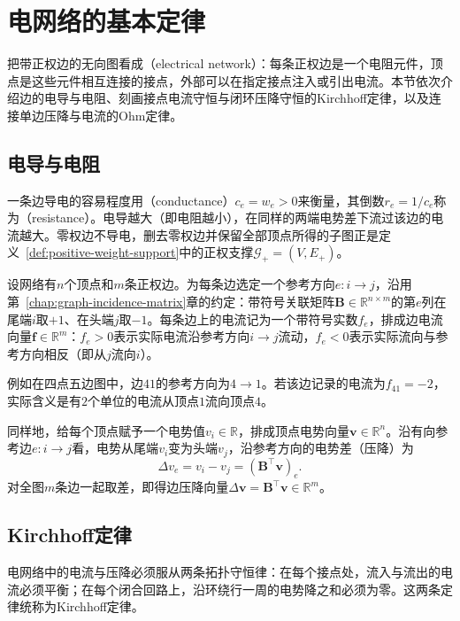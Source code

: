 \section{电网络的基本定律}
\label{sec:electrical-network-laws}

把带正权边的无向图看成（electrical network）：每条正权边是一个电阻元件，顶点是这些元件相互连接的接点，外部可以在指定接点注入或引出电流。本节依次介绍边的电导与电阻、刻画接点电流守恒与闭环压降守恒的Kirchhoff定律，以及连接单边压降与电流的Ohm定律。

\subsection{电导与电阻}
\label{sec:electrical-conductance-resistance}

一条边导电的容易程度用（conductance）$c_e = w_e > 0$来衡量，其倒数$r_e = 1/c_e$称为（resistance）。电导越大（即电阻越小），在同样的两端电势差下流过该边的电流越大。零权边不导电，删去零权边并保留全部顶点所得的子图正是定义~\ref{def:positive-weight-support}中的正权支撑$\mathcal G_+=(V,E_+)$。

设网络有$n$个顶点和$m$条正权边。为每条边选定一个参考方向$e\colon i\to j$，沿用第~\ref{chap:graph-incidence-matrix}章的约定：带符号关联矩阵$\bm B\in\mathbb R^{n\times m}$的第$e$列在尾端$i$取$+1$、在头端$j$取$-1$。每条边上的电流记为一个带符号实数$f_e$，排成边电流向量$\bm f\in\mathbb R^m$：$f_e > 0$表示实际电流沿参考方向$i\to j$流动，$f_e < 0$表示实际流向与参考方向相反（即从$j$流向$i$）。

例如在四点五边图中，边$41$的参考方向为$4\to1$。若该边记录的电流为$f_{41}=-2$，实际含义是有$2$个单位的电流从顶点$1$流向顶点$4$。

同样地，给每个顶点赋予一个电势值$v_i\in\mathbb R$，排成顶点电势向量$\bm v\in\mathbb R^n$。沿有向参考边$e\colon i\to j$看，电势从尾端$v_i$变为头端$v_j$，沿参考方向的电势差（压降）为
\[
  \Delta v_e = v_i - v_j = (\bm B^\top\bm v)_e.
\]
对全图$m$条边一起取差，即得边压降向量$\Delta\bm v = \bm B^\top\bm v\in\mathbb R^m$。

\subsection{Kirchhoff定律}
\label{sec:electrical-current-conservation}

电网络中的电流与压降必须服从两条拓扑守恒律：在每个接点处，流入与流出的电流必须平衡；在每个闭合回路上，沿环绕行一周的电势降之和必须为零。这两条定律统称为Kirchhoff定律。

